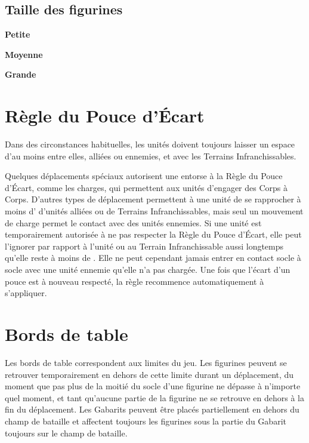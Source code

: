 \subsection{Taille des figurines}
\label{modelheight}


\noindent\textbf{Petite}


\noindent\textbf{Moyenne}


\noindent\textbf{Grande}



\section{Règle du Pouce d'Écart}

Dans des circonstances habituelles, les unités doivent toujours laisser un espace d'au moins  entre elles, alliées ou ennemies, et avec les Terrains Infranchissables. 

Quelques déplacements spéciaux autorisent une entorse à la Règle du Pouce d'Écart, comme les charges, qui permettent aux unités d'engager des Corps à Corps. D'autres types de déplacement permettent à une unité de se rapprocher à moins d' d'unités alliées ou de Terrains Infranchissables, mais seul un mouvement de charge permet le contact avec des unités ennemies. Si une unité est temporairement autorisée à ne pas respecter la Règle du Pouce d'Écart, elle peut l'ignorer par rapport à l'unité ou au Terrain Infranchissable aussi longtemps qu'elle reste à moins de . Elle ne peut cependant jamais entrer en contact socle à socle avec une unité ennemie qu'elle n'a pas chargée. Une fois que l'écart d'un pouce est à nouveau respecté, la règle recommence automatiquement à s'appliquer.

\section{Bords de table}

Les bords de table correspondent aux limites du jeu. Les figurines peuvent se retrouver temporairement en dehors de cette limite durant un déplacement, du moment que pas plus de la moitié du socle d'une figurine ne dépasse à n'importe quel moment, et tant qu'aucune partie de la figurine ne se retrouve en dehors à la fin du déplacement. Les Gabarits peuvent être placés partiellement en dehors du champ de bataille et affectent toujours les figurines sous la partie du Gabarit toujours sur le champ de bataille.

